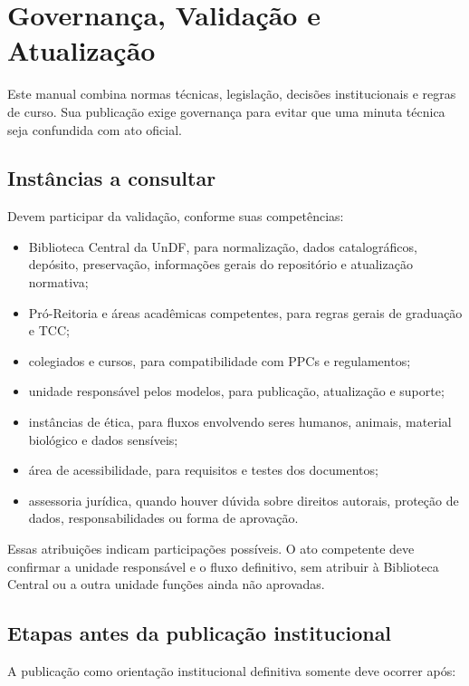 \chapter{Governança, Validação e Atualização}
\label{chap:governanca}

Este manual combina normas técnicas, legislação, decisões institucionais e regras de curso. Sua publicação exige governança para evitar que uma minuta técnica seja confundida com ato oficial.

\section{Instâncias a consultar}

Devem participar da validação, conforme suas competências:

\begin{itemize}
  \item Biblioteca Central da UnDF, para normalização, dados catalográficos, depósito, preservação, informações gerais do repositório e atualização normativa;
  \item Pró-Reitoria e áreas acadêmicas competentes, para regras gerais de graduação e TCC;
  \item colegiados e cursos, para compatibilidade com PPCs e regulamentos;
  \item unidade responsável pelos modelos, para publicação, atualização e suporte;
  \item instâncias de ética, para fluxos envolvendo seres humanos, animais, material biológico e dados sensíveis;
  \item área de acessibilidade, para requisitos e testes dos documentos;
  \item assessoria jurídica, quando houver dúvida sobre direitos autorais, proteção de dados, responsabilidades ou forma de aprovação.
\end{itemize}

Essas atribuições indicam participações possíveis. O ato competente deve confirmar a unidade responsável e o fluxo definitivo, sem atribuir à Biblioteca Central ou a outra unidade funções ainda não aprovadas.

\section{Etapas antes da publicação institucional}

A publicação como orientação institucional definitiva somente deve ocorrer após:

